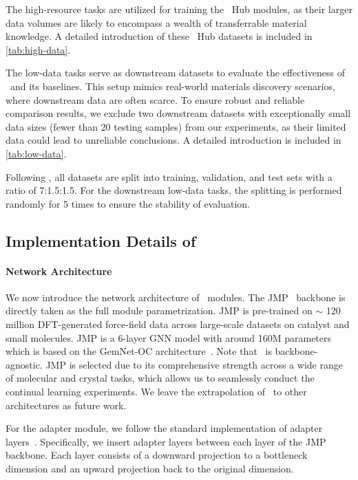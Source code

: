 The high-resource tasks are utilized for training the \name \ Hub modules, as their larger data volumes are likely to encompass a wealth of transferrable material knowledge. A detailed introduction of these \name \ Hub datasets is included in \cref{tab:high-data}.

The low-data tasks serve as downstream datasets to evaluate the effectiveness of \name \ and its baselines. This setup mimics real-world materials discovery scenarios, where downstream data are often scarce. To ensure robust and reliable comparison results, we exclude two downstream datasets with exceptionally small data sizes (fewer than 20 testing samples) from our experiments, as their limited data could lead to unreliable conclusions. A detailed introduction is included in \cref{tab:low-data}.

Following \citet{chang2022towards}, all datasets are split into training, validation, and test sets with a ratio of 7:1.5:1.5. For the downstream low-data tasks, the splitting is performed randomly for 5 times to ensure the stability of evaluation.


\subsection{Implementation Details of \name}
\label{appendix:imp}

\paragraph{Network Architecture}
We now introduce the network architecture of \name \ modules. The JMP~\citep{shoghi2023molecules} backbone is directly taken as the full module parametrization. JMP is pre-trained on $\sim$ 120 million DFT-generated force-field data across large-scale datasets on catalyst and small molecules. JMP is a 6-layer GNN model with around 160M parameters which is based on the GemNet-OC architecture~\citep{gasteiger2022gemnet}.
Note that \name \ is backbone-agnostic. JMP is selected due to its comprehensive strength across a wide range of molecular and crystal tasks, which allows us to seamlessly conduct the continual learning experiments.
We leave the extrapolation of \name \ to other architectures as future work.

For the adapter module, we follow the standard implementation of adapter layers~\citep{houlsby2019parameter}.
Specifically, we insert adapter layers between each layer of the JMP backbone. Each layer consists of a downward projection to a bottleneck dimension and an upward projection back to the original dimension. 

